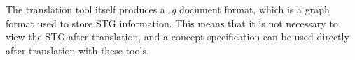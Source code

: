 \documentclass[british, journal]{IEEEtran}
\newcommand{\noun}[1]{\textsc{#1}}
\begin{document}
The translation tool itself produces a \emph{.g} document format, which is a
graph format used to store STG information. This means that it is not
necessary to view the STG after translation, and a concept specification
can be used directly after translation with these tools. 



\end{document}
